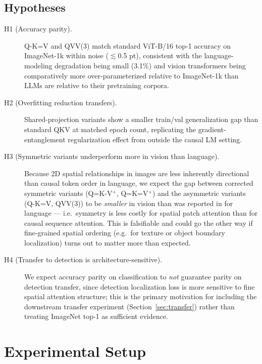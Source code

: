 \documentclass[11pt]{article}
\begin{document}
\subsection{Hypotheses}
\label{sec:hypotheses}
\begin{description}
    \item[H1 (Accuracy parity).] Q-K=V and QVV(3) match standard ViT-B/16
    top-1 accuracy on ImageNet-1k within noise (\(\lesssim\)0.5 pt),
    consistent with the language-modeling degradation being small
    (3.1\%) and vision transformers being comparatively more
    over-parameterized relative to ImageNet-1k than LLMs are relative to
    their pretraining corpora.
    \item[H2 (Overfitting reduction transfers).] Shared-projection variants
    show a smaller train/val generalization gap than standard QKV at
    matched epoch count, replicating the gradient-entanglement
    regularization effect from \citet{gao2026keyless} outside the causal
    LM setting.
    \item[H3 (Symmetric variants underperform more in vision than language).]
    Because 2D spatial relationships in images are less inherently
    directional than causal token order in language, we expect the gap
    between corrected symmetric variants (Q=K-V\(^+\), Q=K=V\(^+\)) and
    the asymmetric variants (Q-K=V, QVV(3)) to be \emph{smaller} in vision
    than was reported in \citet{kayyam2026three} for language --- i.e.\
    symmetry is less costly for spatial patch attention than for causal
    sequence attention. This is falsifiable and could go the other way if
    fine-grained spatial ordering (e.g.\ for texture or object boundary
    localization) turns out to matter more than expected.
    \item[H4 (Transfer to detection is architecture-sensitive).] We expect
    accuracy parity on classification to \emph{not} guarantee parity on
    detection transfer, since detection localization loss is more
    sensitive to fine spatial attention structure; this is the primary
    motivation for including the downstream transfer experiment
    (Section~\ref{sec:transfer}) rather than treating ImageNet top-1 as
    sufficient evidence.
\end{description}

\section{Experimental Setup}
\label{sec:setup}
\end{document}
